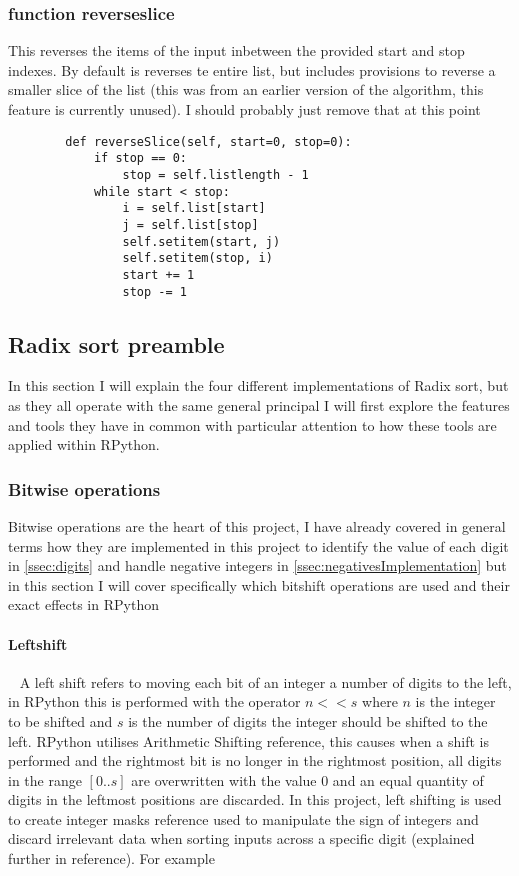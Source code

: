 \documentclass[12pt]{article}
\begin{document}
\subsubsection{function reverse\textunderscore slice}
This reverses the items of the input inbetween the provided start and stop indexes. By default is reverses te entire list, but includes provisions to reverse a smaller slice of the list (this was from an earlier version of the algorithm, this feature is currently unused). {\color{red}I should probably just remove that at this point}
\begin{lstlisting}
        def reverseSlice(self, start=0, stop=0):
            if stop == 0:
                stop = self.listlength - 1
            while start < stop:
                i = self.list[start]
                j = self.list[stop]
                self.setitem(start, j)
                self.setitem(stop, i)
                start += 1
                stop -= 1
      \end{lstlisting}
\pagebreak
\subsection{Radix sort preamble}
In this section I will explain the four different implementations of Radix sort, but as they all operate with the same general principal I will first explore the features and tools they have in common with particular attention to how these tools are applied within RPython.
\subsubsection{Bitwise operations}
Bitwise operations are the heart of this project, I have already covered in general terms how they are implemented in this project to identify the value of each digit in \ref{ssec:digits} and handle negative integers in \ref{ssec:negativesImplementation} but in this section I will cover specifically which bitshift operations are used and their exact effects in RPython
\newline
\paragraph{Leftshift}\
\label{sssec:leftshift}
\newline
A left shift refers to moving each bit of an integer a number of digits to the left, in RPython this is performed with the operator $n << s$ where $n$ is the integer to be shifted and $s$ is the number of digits the integer should be shifted to the left.
\newline
RPython utilises Arithmetic Shifting {\color{red}reference}, this causes when a shift is performed and the rightmost bit is no longer in the rightmost position, all digits in the range $[0 .. s]$ are overwritten with the value 0 and an equal quantity of digits in the leftmost positions are discarded.
\newline
\newline
In this project, left shifting is used to create integer masks {\color{red}reference} used to manipulate the sign of integers and discard irrelevant data when sorting inputs across a specific digit (explained further in {\color{red}reference}). 
\newline
For example
\end{document}
